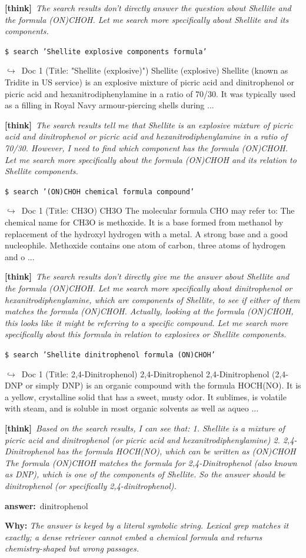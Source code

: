 \documentclass{llmxive}
\providecommand{\winbadge}{\colorbox{green!50!black}{\scriptsize\bfseries\,WIN\,}}
\providecommand{\thk}[1]{{\footnotesize\textbf{[think]}\ \textit{#1}\par}}
\providecommand{\cmd}[1]{{\footnotesize\texttt{\$\ #1}\par}}
\providecommand{\retr}[1]{{\footnotesize\quad$\hookrightarrow$\ #1\par}}
\providecommand{\ans}[1]{{\footnotesize\textbf{answer:}\ #1\par}}
\begin{document}
\begin{cmpbox}[label={ex:hotpot-formula},title={\winbadge\ \ \textsc{HotpotQA -- symbolic / rare-token match}}]
  \thk{The search results don't directly answer the question about Shellite and the formula (ON)CHOH. Let me search more specifically about Shellite and its components.}
  \cmd{search 'Shellite explosive components formula'}
  \retr{Doc 1 (Title: "Shellite (explosive)") Shellite (explosive) Shellite (known as Tridite in US service) is an explosive mixture of picric acid and dinitrophenol or picric acid and hexanitrodiphenylamine in a ratio of 70/30. It was typically used as a filling in Royal Navy armour-piercing shells during ...}
  \thk{The search results tell me that Shellite is an explosive mixture of picric acid and dinitrophenol or picric acid and hexanitrodiphenylamine in a ratio of 70/30. However, I need to find which component has the formula (ON)CHOH. Let me search more specifically about the formula (ON)CHOH and its relation to Shellite components.}
  \cmd{search '(ON)CHOH chemical formula compound'}
  \retr{Doc 1 (Title: CH3O) CH3O The molecular formula CHO may refer to: The chemical name for CH3O is methoxide. It is a base formed from methanol by replacement of the hydroxyl hydrogen with a metal. A strong base and a good nucleophile. Methoxide contains one atom of carbon, three atoms of hydrogen and o ...}
  \thk{The search results don't directly give me the answer about Shellite and the formula (ON)CHOH. Let me search more specifically about dinitrophenol or hexanitrodiphenylamine, which are components of Shellite, to see if either of them matches the formula (ON)CHOH. Actually, looking at the formula (ON)CHOH, this looks like it might be referring to a specific compound. Let me search more specifically about this formula in relation to explosives or Shellite components.}
  \cmd{search 'Shellite dinitrophenol formula (ON)CHOH'}
  \retr{Doc 1 (Title: 2,4-Dinitrophenol) 2,4-Dinitrophenol 2,4-Dinitrophenol (2,4-DNP or simply DNP) is an organic compound with the formula HOCH(NO). It is a yellow, crystalline solid that has a sweet, musty odor. It sublimes, is volatile with steam, and is soluble in most organic solvents as well as aqueo ...}
  \thk{Based on the search results, I can see that: 1. Shellite is a mixture of picric acid and dinitrophenol (or picric acid and hexanitrodiphenylamine) 2. 2,4-Dinitrophenol has the formula HOCH(NO), which can be written as (ON)CHOH The formula (ON)CHOH matches the formula for 2,4-Dinitrophenol (also known as DNP), which is one of the components of Shellite. So the answer should be dinitrophenol (or specifically 2,4-dinitrophenol).}
  \ans{dinitrophenol}
\smallskip\par\textbf{Why:} \textit{The answer is keyed by a literal symbolic string. Lexical grep matches it exactly; a dense retriever cannot embed a chemical formula and returns chemistry-shaped but wrong passages.}
\end{cmpbox}\bigskip
\end{document}
